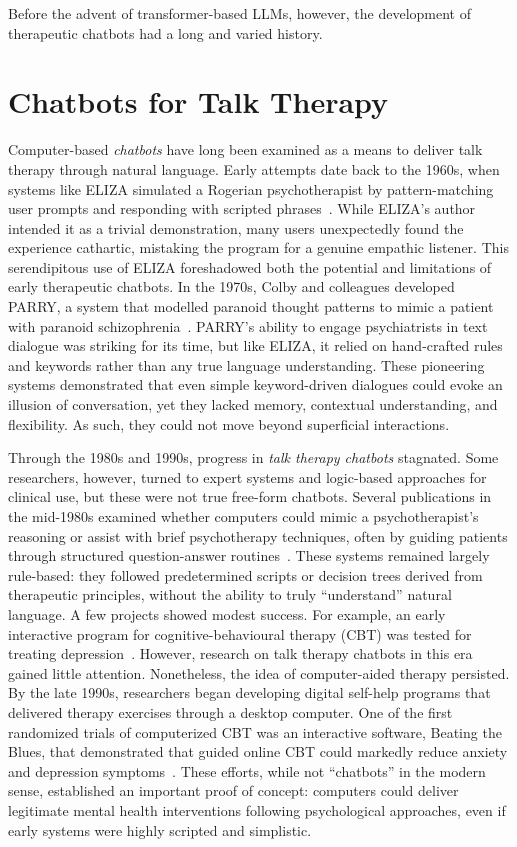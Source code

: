 Before the advent of transformer-based LLMs, however, the development of therapeutic chatbots had a long and varied history.


\section{Chatbots for Talk Therapy}
Computer-based \emph{chatbots} have long been examined as a means to deliver talk therapy through natural language. Early attempts date back to the 1960s, when systems like ELIZA simulated a Rogerian psychotherapist by pattern-matching user prompts and responding with scripted phrases~\cite{Weizenbaum1966}. While ELIZA's author intended it as a trivial demonstration, many users unexpectedly found the experience cathartic, mistaking the program for a genuine empathic listener. This serendipitous use of ELIZA foreshadowed both the potential and limitations of early therapeutic chatbots. In the 1970s, Colby and colleagues developed PARRY, a system that modelled paranoid thought patterns to mimic a patient with paranoid schizophrenia~\cite{Colby1971}. PARRY's ability to engage psychiatrists in text dialogue was striking for its time, but like ELIZA, it relied on hand-crafted rules and keywords rather than any true language understanding. These pioneering systems demonstrated that even simple keyword-driven dialogues could evoke an illusion of conversation, yet they lacked memory, contextual understanding, and flexibility. As such, they could not move beyond superficial interactions.


Through the 1980s and 1990s, progress in \emph{talk therapy chatbots} stagnated. Some researchers, however, turned to expert systems and logic-based approaches for clinical use, but these were not true free-form chatbots. Several publications in the mid-1980s examined whether computers could mimic a psychotherapist's reasoning or assist with brief psychotherapy techniques, often by guiding patients through structured question-answer routines~\cite{Hartman1986,Sampson1986,ServanSchreiber1986}. These systems remained largely rule-based: they followed predetermined scripts or decision trees derived from therapeutic principles, without the ability to truly ``understand'' natural language. A few projects showed modest success. For example, an early interactive program for cognitive-behavioural therapy (CBT) was tested for treating depression~\cite{Selmi1990}. However, research on talk therapy chatbots in this era gained little attention. Nonetheless, the idea of computer-aided therapy persisted. By the late 1990s, researchers began developing digital self-help programs that delivered therapy exercises through a desktop computer. One of the first randomized trials of computerized CBT was an interactive software, Beating the Blues, that demonstrated that guided online CBT could markedly reduce anxiety and depression symptoms~\cite{Proudfoot2003}. These efforts, while not ``chatbots'' in the modern sense, established an important proof of concept: computers could deliver legitimate mental health interventions following psychological approaches, even if early systems were highly scripted and simplistic.


